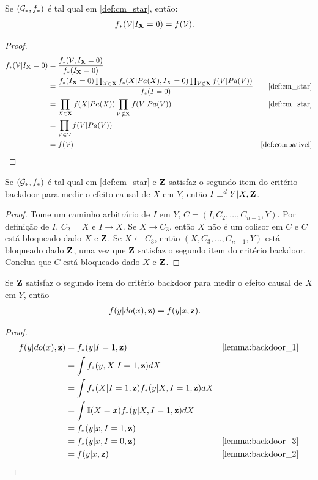 \begin{lemma}
 \label{lemma:backdoor_2}
 Se $({\mathcal G}_*, f_*)$ é tal qual em \cref{def:cm_star}, então:
 \begin{align*}
  f_*({\mathcal V}|I_{{\mathbf{X}}}=0) &= f({\mathcal V}).
 \end{align*}
\end{lemma}

\begin{proof}
 \begin{align*}
  f_*(\sV|I_{\X}=0) 
  &= \frac{f_*(\sV, I_{\X}=0)}{f_*(I_{\X}=0)} \\
  &= \frac{f_*(I_{\X}=0)\prod_{X \in \X}f_*(X|Pa(X),I_{X}=0)
  \prod_{V \notin \X} f(V|Pa(V))}{f_*(I=0)}
  & \text{\cref{def:cm_star}} \\
  &= \prod_{X \in \X}f(X|Pa(X))\prod_{V \notin \X} f(V|Pa(V))
  & \text{\cref{def:cm_star}} \\
  &= \prod_{V \in \sV} f(V|Pa(V)) \\
  &= f(\sV) 
  & \text{\cref{def:compativel}}
 \end{align*}
\end{proof}

\begin{lemma}
 \label{lemma:backdoor_3}
 Se $({\mathcal G}_*, f_*)$ é tal qual em \cref{def:cm_star} e
 ${\mathbf{Z}}$ satisfaz o segundo item do critério backdoor para
 medir o efeito causal de $X$ em $Y$, então $I \perp^d Y | X, {\mathbf{Z}}$.
\end{lemma}

\begin{proof}
 Tome um caminho arbitrário de
 $I$ em $Y$, $C = (I, C_2, \ldots, C_{n-1}, Y)$.
 Por definição de $I$, $C_2 = X$ e 
 $I \rightarrow X$. 
 Se $X \rightarrow C_3$, então
 $X$ não é um colisor em $C$ e 
 $C$ está bloqueado dado $X$ e ${\mathbf{Z}}$.
 Se $X \leftarrow C_3$, então
 $(X, C_3, \ldots, C_{n-1}, Y)$ está bloqueado
 dado ${\mathbf{Z}}$, uma vez que ${\mathbf{Z}}$ satisfaz
 o segundo item do critério backdoor.
 Conclua que $C$ está bloqueado dado $X$ e ${\mathbf{Z}}$.
\end{proof}

\begin{lemma}
 \label{thm:backdoor_pt_1}
 Se ${\mathbf{Z}}$ satisfaz 
 o segundo item do critério backdoor para
 medir o efeito causal de $X$ em $Y$, então
 \begin{align*}
  f(y|do(x),{\mathbf{z}}) &= f(y|x,{\mathbf{z}}).
 \end{align*}
\end{lemma}

\begin{proof}
 \begin{align*}
  f(y|do(x),\z)
  &= f_*(y|I=1, \z)
  & \text{\cref{lemma:backdoor_1}} \\
  &= \int f_*(y,X|I=1, \z)dX \\
  &= \int f_*(X|I=1,\z)f_*(y|X, I=1, \z)dX \\
  &= \int \I(X=x)f_*(y|X, I=1, \z)dX \\
  &= f_*(y|x,I=1,\z) \\
  &= f_*(y|x,I=0,\z)
  & \text{\cref{lemma:backdoor_3}} \\
  &= f(y|x,\z)
  & \text{\cref{lemma:backdoor_2}}
 \end{align*}
\end{proof}

